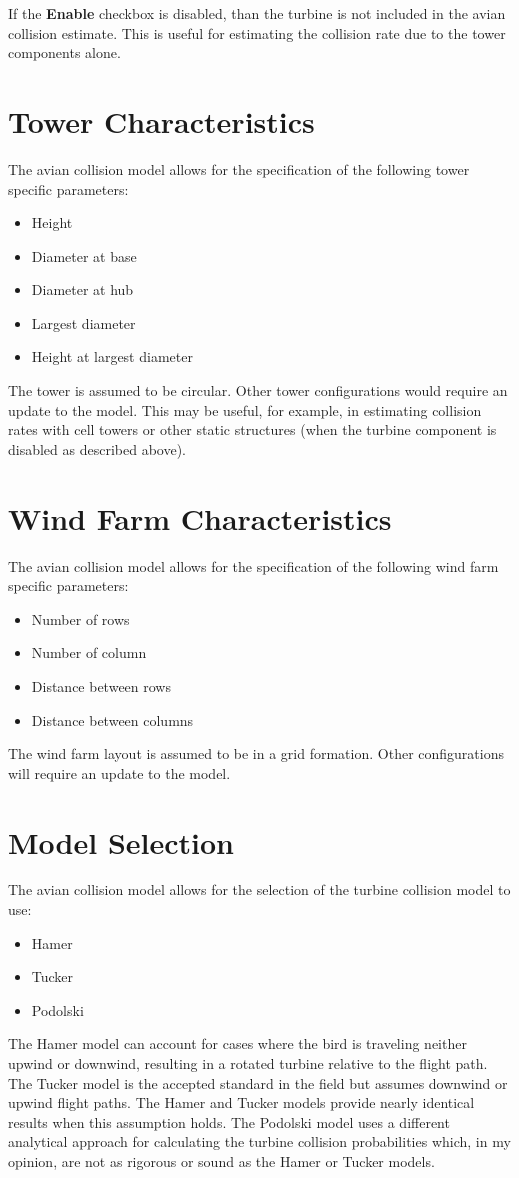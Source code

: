 \documentclass[11pt,letterpaper,openany]{report}
\begin{document}
If the \textbf{Enable} checkbox is disabled, than the turbine is not included in the avian collision estimate. This is
useful for estimating the collision rate due to the tower components alone.

\section{Tower Characteristics}
The avian collision model allows for the specification of the following tower specific parameters:
\begin{itemize}
  \item Height
  \item Diameter at base
  \item Diameter at hub
  \item Largest diameter
  \item Height at largest diameter
\end{itemize}
The tower is assumed to be circular. Other tower configurations would require an update to the model. This may be
useful, for example, in estimating collision rates with cell towers or other static structures (when the turbine
component is disabled as described above).

\section{Wind Farm Characteristics}
The avian collision model allows for the specification of the following wind farm specific parameters:
\begin{itemize}
  \item Number of rows
  \item Number of column
  \item Distance between rows
  \item Distance between columns
\end{itemize}
The wind farm layout is assumed to be in a grid formation. Other configurations will require an update to the model.

\section{Model Selection}
The avian collision model allows for the selection of the turbine collision model to use:
\begin{itemize}
  \item Hamer
  \item Tucker
  \item Podolski
\end{itemize}
The Hamer model can account for cases where the bird is traveling neither upwind or downwind, resulting in a rotated
turbine relative to the flight path. The Tucker model is the accepted standard in the field but assumes downwind or
upwind flight paths. The Hamer and Tucker models provide nearly identical results when this assumption holds. The
Podolski model uses a different analytical approach for calculating the turbine collision probabilities which, in my
opinion, are not as rigorous or sound as the Hamer or Tucker models.
\end{document}
